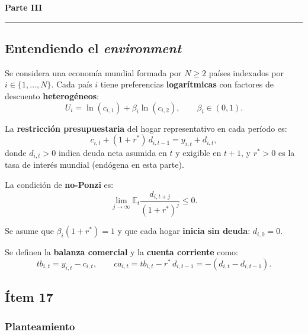 \begin{center}
    {\LARGE \textbf{Parte III}}\\[6pt]
\end{center}
\vspace{4pt}\hrule\vspace{10pt}

\subsection*{Entendiendo el \textit{environment}}

Se considera una economía mundial formada por $N \geq 2$ países indexados por
$i \in \{1, \ldots, N\}$.
Cada país $i$ tiene preferencias \textbf{logarítmicas} con factores de descuento
\textbf{heterogéneos}:
\[
    U_i = \ln(c_{i,1}) + \beta_i \ln(c_{i,2}), \qquad \beta_i \in (0,1).
\]

La \textbf{restricción presupuestaria} del hogar representativo en cada período es:
\begin{equation}\label{eq:rp}
    c_{i,t} + (1+r^*)\,d_{i,t-1} = y_{i,t} + d_{i,t},
\end{equation}
donde $d_{i,t}>0$ indica deuda neta asumida en $t$ y exigible en $t+1$,
y $r^*>0$ es la tasa de interés mundial (endógena en esta parte).

La condición de \textbf{no-Ponzi} es:
\[
    \lim_{j\to\infty} \mathbb{E}_t \frac{d_{i,t+j}}{(1+r^*)^j} \leq 0.
\]

Se asume que $\beta_i(1+r^*)=1$ y que cada hogar \textbf{inicia sin deuda}:
$d_{i,0}=0$.

Se definen la \textbf{balanza comercial} y la \textbf{cuenta corriente} como:
\[
    tb_{i,t} = y_{i,t} - c_{i,t}, \qquad
    ca_{i,t} = tb_{i,t} - r^*\,d_{i,t-1} = -(d_{i,t} - d_{i,t-1}).
\]

\subsection*{Ítem 17}

\subsubsection*{Planteamiento}

